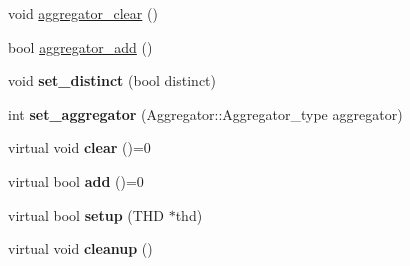 \begin{DoxyCompactItemize}
void \mbox{\hyperlink{classItem__sum_a15e7047e85571842d5aada49784f4278}{aggregator\+\_\+clear}} ()
\item 
bool \mbox{\hyperlink{classItem__sum_ab090330ed58167234556e1f906976c0c}{aggregator\+\_\+add}} ()
\item 
\mbox{\label{classItem__sum_ab6d6dadc286edb069d017f4e24dbaa3e}} 
void {\bfseries set\+\_\+distinct} (bool distinct)
\item 
\mbox{\label{classItem__sum_ab0685e05aefcfee71e20d11bcb06e406}} 
int {\bfseries set\+\_\+aggregator} (Aggregator\+::\+Aggregator\+\_\+type aggregator)
\item 
\mbox{\label{classItem__sum_a7a25abf6a2e7f8e21b54b6e3e163efb6}} 
virtual void {\bfseries clear} ()=0
\item 
\mbox{\label{classItem__sum_a41c914f3c66a8f4f2f7347d84a5146e7}} 
virtual bool {\bfseries add} ()=0
\item 
\mbox{\label{classItem__sum_a4be3f81909455d393f78956d701ebe9c}} 
virtual bool {\bfseries setup} (T\+HD $\ast$thd)
\item 
\mbox{\label{classItem__sum_a684aa82ea6a3865ccd33e1d6a35af4df}} 
virtual void {\bfseries cleanup} ()
\end{DoxyCompactItemize}
